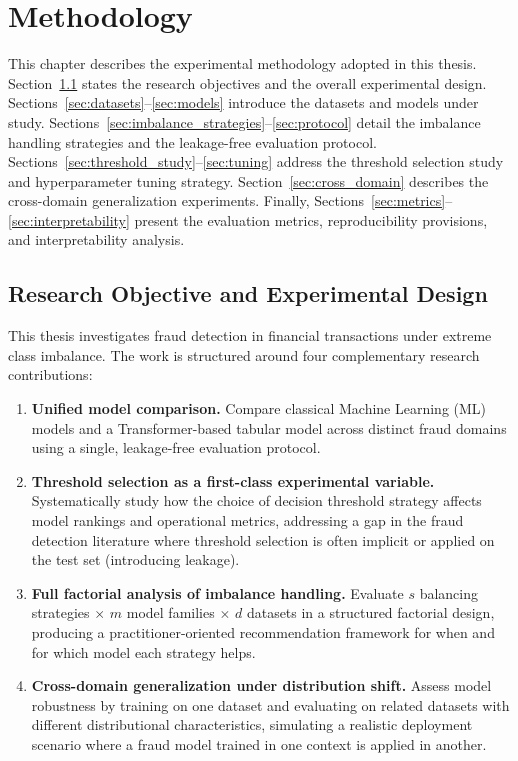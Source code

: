 ﻿\chapter{Methodology}
\label{sec:chapterMethodology}

This chapter describes the experimental methodology adopted in this thesis. Section~\ref{sec:objective} states the research objectives and the overall experimental design. Sections~\ref{sec:datasets}--\ref{sec:models} introduce the datasets and models under study. Sections~\ref{sec:imbalance_strategies}--\ref{sec:protocol} detail the imbalance handling strategies and the leakage-free evaluation protocol. Sections~\ref{sec:threshold_study}--\ref{sec:tuning} address the threshold selection study and hyperparameter tuning strategy. Section~\ref{sec:cross_domain} describes the cross-domain generalization experiments. Finally, Sections~\ref{sec:metrics}--\ref{sec:interpretability} present the evaluation metrics, reproducibility provisions, and interpretability analysis.

\section{Research Objective and Experimental Design}
\label{sec:objective}

This thesis investigates fraud detection in financial transactions under extreme class imbalance. The work is structured around four complementary research contributions:

\begin{enumerate}
  \item \textbf{Unified model comparison.} Compare classical Machine Learning (ML) models and a Transformer-based tabular model across distinct fraud domains using a single, leakage-free evaluation protocol.

  \item \textbf{Threshold selection as a first-class experimental variable.} Systematically study how the choice of decision threshold strategy affects model rankings and operational metrics, addressing a gap in the fraud detection literature where threshold selection is often implicit or applied on the test set (introducing leakage).

  \item \textbf{Full factorial analysis of imbalance handling.} Evaluate $s$ balancing strategies $\times$ $m$ model families $\times$ $d$ datasets in a structured factorial design, producing a practitioner-oriented recommendation framework for when and for which model each strategy helps.

  \item \textbf{Cross-domain generalization under distribution shift.} Assess model robustness by training on one dataset and evaluating on related datasets with different distributional characteristics, simulating a realistic deployment scenario where a fraud model trained in one context is applied in another.
\end{enumerate}

